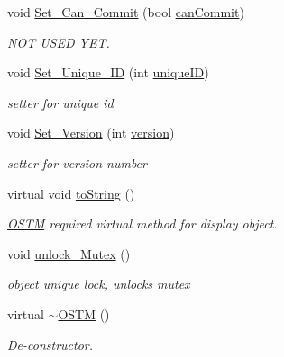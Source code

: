 \begin{DoxyCompactItemize}
void \hyperlink{class_o_s_t_m_a813ee61c9d1c83c6a6ae30d12aca8a5d_a813ee61c9d1c83c6a6ae30d12aca8a5d}{Set\+\_\+\+Can\+\_\+\+Commit} (bool \hyperlink{class_o_s_t_m_a2a5b89641af274ddc69bdf8c1c1a07d6_a2a5b89641af274ddc69bdf8c1c1a07d6}{can\+Commit})
\begin{DoxyCompactList}\small\item\em N\+OT U\+S\+ED Y\+ET. \end{DoxyCompactList}\item 
void \hyperlink{class_o_s_t_m_ab5019a32185631c08abbf826422f2d93_ab5019a32185631c08abbf826422f2d93}{Set\+\_\+\+Unique\+\_\+\+ID} (int \hyperlink{class_o_s_t_m_aa9fe59368b701af7f70befa23bd6901a_aa9fe59368b701af7f70befa23bd6901a}{unique\+ID})
\begin{DoxyCompactList}\small\item\em setter for unique id \end{DoxyCompactList}\item 
void \hyperlink{class_o_s_t_m_a9529ad8d6d28c1f0cc9b86ed91df1ae1_a9529ad8d6d28c1f0cc9b86ed91df1ae1}{Set\+\_\+\+Version} (int \hyperlink{class_o_s_t_m_a9a6ea36181be2db7f9082d77956511d7_a9a6ea36181be2db7f9082d77956511d7}{version})
\begin{DoxyCompactList}\small\item\em setter for version number \end{DoxyCompactList}\item 
virtual void \hyperlink{class_o_s_t_m_a513396a115f2987fd07c203309ae8a59_a513396a115f2987fd07c203309ae8a59}{to\+String} ()
\begin{DoxyCompactList}\small\item\em \hyperlink{class_o_s_t_m}{O\+S\+TM} required virtual method for display object. \end{DoxyCompactList}\item 
void \hyperlink{class_o_s_t_m_a6cd703bc26c719fd95b4f5362d050762_a6cd703bc26c719fd95b4f5362d050762}{unlock\+\_\+\+Mutex} ()
\begin{DoxyCompactList}\small\item\em object unique lock, unlocks mutex \end{DoxyCompactList}\item 
virtual \hyperlink{class_o_s_t_m_a30a17d73d0259c60eeab72d6dfa9ceb1_a30a17d73d0259c60eeab72d6dfa9ceb1}{$\sim$\+O\+S\+TM} ()
\begin{DoxyCompactList}\small\item\em De-\/constructor. \end{DoxyCompactList}\end{DoxyCompactItemize}
